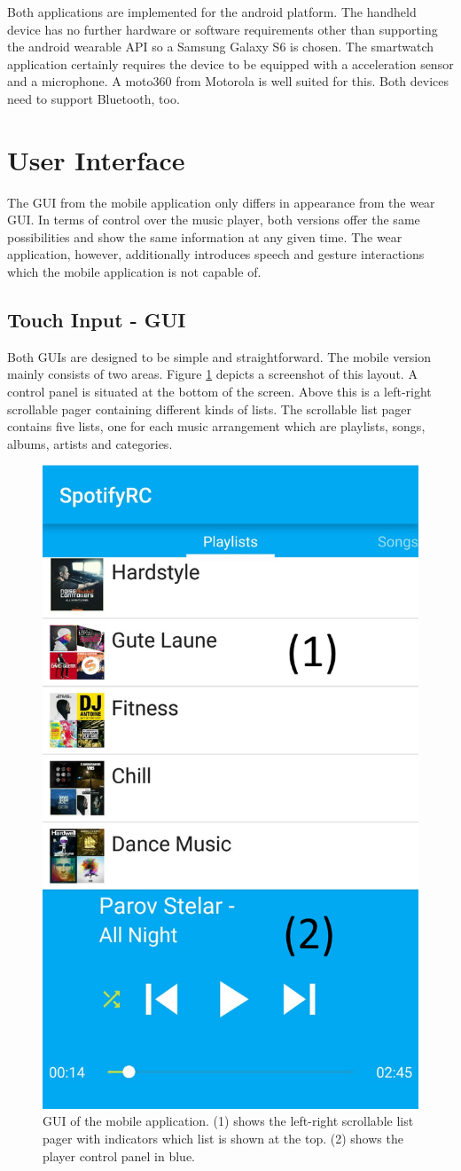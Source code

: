 Both applications are implemented for the android platform. The handheld device has no further hardware or software requirements other than supporting the android wearable \ac{API} so a Samsung Galaxy S6 is chosen. The smartwatch application certainly requires the device to be equipped with a acceleration sensor and a microphone. A moto360 from Motorola is well suited for this. Both devices need to support Bluetooth, too.

\section{User Interface}
The \ac{GUI} from the mobile application only differs in appearance from the wear \ac{GUI}. In terms of control over the music player, both versions offer the same possibilities and show the same information at any given time. The wear application, however, additionally introduces speech and gesture interactions which the mobile application is not capable of.

\subsection{Touch Input - \ac{GUI}}
Both \ac{GUI}s are designed to be simple and straightforward. The mobile version mainly consists of two areas. Figure \ref{fig:mobileGUI} depicts a screenshot of this layout. A control panel is situated at the bottom of the screen. Above this is a left-right scrollable pager containing different kinds of lists.  The scrollable list pager contains five lists, one for each music arrangement which are playlists, songs, albums, artists and categories.
\begin{figure}[bth]
	\myfloatalign
	\includegraphics[width=.45\linewidth]{img/mobileGUIlabeled.png}
	\caption{\ac{GUI} of the mobile application. (1) shows the left-right scrollable list pager with indicators which list is shown at the top. (2) shows the player control panel in blue.}
	\label{fig:mobileGUI}
\end{figure}

